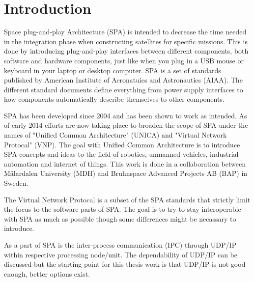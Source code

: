 \chapter{Introduction}
Space plug-and-play Architecture (SPA) is intended to decrease the time needed in
the integration phase when constructing satellites for specific missions. This
is done by introducing plug-and-play interfaces between different components,
both software and hardware components, just like when you plug in a USB mouse
or keyboard in your laptop or desktop computer. SPA is a set of standards
published by American Institute of Aeronatuics and Astronautics (AIAA). The
different standard documents define everything from power supply interfaces to
how components automatically describe themselves to other components.


SPA has been developed since 2004 and has been shown to work as intended. As of
early 2014 efforts are now taking place to broaden the scope of SPA under the
names of "Unified Common Architecture" (UNICA) and "Virtual Network Protocal"
(VNP). The goal with Unified Common Architecture is to introduce SPA concepts
and ideas to the field of robotics, unmanned vehicles, industrial automation
and internet of things. This work is done in a collaboration between
M\"{a}lardalen University (MDH) and Bruhnspace Advanced Projects AB (BAP) in
Sweden.


The Virtual Network Protocal is a subset of the SPA standards that
strictly limit the focus to the software parts of SPA. The goal is to try to
stay interoperable with SPA as much as possible though some differences might
be necassary to introduce.

As a part of SPA is the inter-process communication (IPC)
through UDP/IP within respective processing node/unit. The dependability of
UDP/IP can be discussed but the starting point for this thesis work is that
UDP/IP is not good enough, better options exist.

